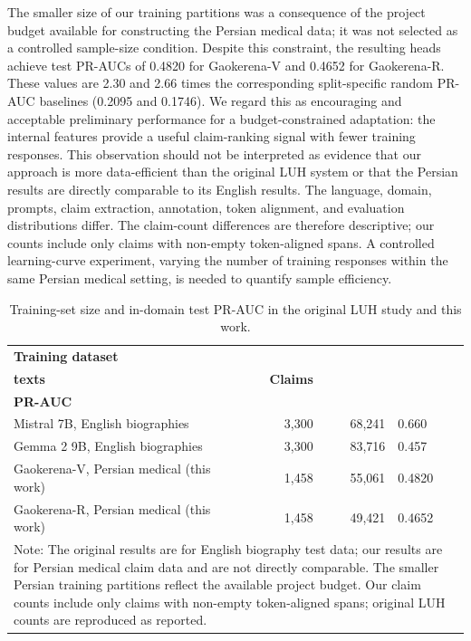 \documentclass[conference,a4paper]{IEEEtran}
\begin{document}
The smaller size of our training partitions was a consequence of the project budget available for constructing the Persian medical data; it was not selected as a controlled sample-size condition. Despite this constraint, the resulting heads achieve test PR-AUCs of 0.4820 for Gaokerena-V and 0.4652 for Gaokerena-R. These values are 2.30 and 2.66 times the corresponding split-specific random PR-AUC baselines (0.2095 and 0.1746). We regard this as encouraging and acceptable preliminary performance for a budget-constrained adaptation: the internal features provide a useful claim-ranking signal with fewer training responses. This observation should not be interpreted as evidence that our approach is more data-efficient than the original LUH system or that the Persian results are directly comparable to its English results. The language, domain, prompts, claim extraction, annotation, token alignment, and evaluation distributions differ. The claim-count differences are therefore descriptive; our counts include only claims with non-empty token-aligned spans. A controlled learning-curve experiment, varying the number of training responses within the same Persian medical setting, is needed to quantify sample efficiency.

\begin{table}[!b]
\centering
\footnotesize
\setlength{\tabcolsep}{3pt}
\caption{Training-set size and in-domain test PR-AUC in the original LUH study and this work.}
\label{tab:training_scale}
\begin{tabular}{p{}rrp{}}
\toprule
\textbf{Training dataset} & \shortstack{\textbf{Responses/}\\\textbf{texts}} & \textbf{Claims} & \shortstack{\textbf{Test}\\\textbf{PR-AUC}} \\
\midrule
Mistral 7B, English biographies~\cite{b1} & 3,300 & 68,241 & 0.660 \\
Gemma 2 9B, English biographies~\cite{b1} & 3,300 & 83,716 & 0.457 \\
Gaokerena-V, Persian medical (this work) & 1,458 & 55,061 & 0.4820 \\
Gaokerena-R, Persian medical (this work) & 1,458 & 49,421 & 0.4652 \\
\midrule
\multicolumn{4}{p{0.89\columnwidth}}{\footnotesize Note: The original results are for English biography test data; our results are for Persian medical claim data and are not directly comparable. The smaller Persian training partitions reflect the available project budget. Our claim counts include only claims with non-empty token-aligned spans; original LUH counts are reproduced as reported.} \\
\bottomrule
\end{tabular}
\end{table}
\end{document}
